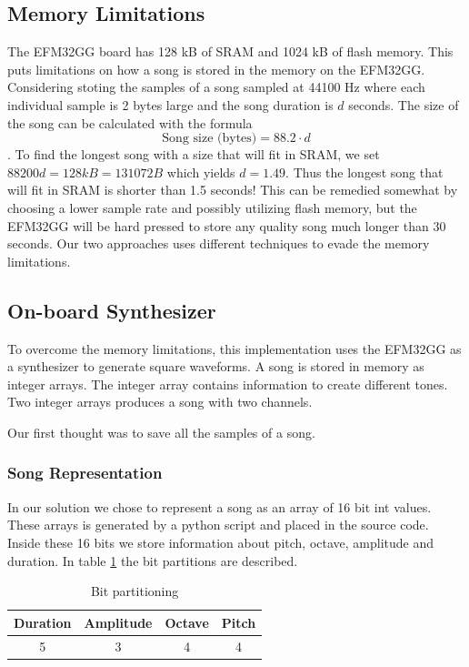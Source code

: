 \subsection{Memory Limitations}
The EFM32GG board has 128 kB of SRAM and 1024 kB of flash memory. This puts limitations on how a song is stored in the memory on the EFM32GG. Considering stoting the samples of a song sampled at 44100 Hz where each individual sample is 2 bytes large and the song duration is $d$ seconds. The size of the song can be calculated with the formula
$$\text{Song size (bytes)} = 88.2 \cdot d$$.
To find the longest song with a size that will fit in SRAM, we set $88200d = 128 kB = 131072 B$ which yields $d = 1.49$. Thus the longest song that will fit in SRAM is shorter than 1.5 seconds! This can be remedied somewhat by choosing a lower sample rate and possibly utilizing flash memory, but the EFM32GG will be hard pressed to store any quality song much longer than 30 seconds. Our two approaches uses different techniques to evade the memory limitations.

\subsection{On-board Synthesizer}\label{sec:onboard-synthesizer}
To overcome the memory limitations, this implementation uses the EFM32GG as a synthesizer to generate square waveforms. A song is stored in memory as integer arrays. The integer array contains information to create different tones. Two integer arrays produces a song with two channels.

Our first thought was to save all the samples of a song. 

\subsubsection{Song Representation}
In our solution we chose to represent a song as an array of 16 bit int values. These arrays is generated by a python script and placed in the source code. Inside these 16 bits we store information about pitch, octave, amplitude and duration. In table \ref{tab:bitFields} the bit partitions are described.

\begin{table}[H]
	\begin{center}
	\begin{tabular}{ |c|c|c|c| }
	  \hline
	  Duration & Amplitude & Octave & Pitch \\
	  \hline
	  5 & 3 & 4 & 4 \\
	  \hline

	\end{tabular}
	\caption{Bit partitioning}
	\label{tab:bitFields}
	\end{center}
\end{table}

